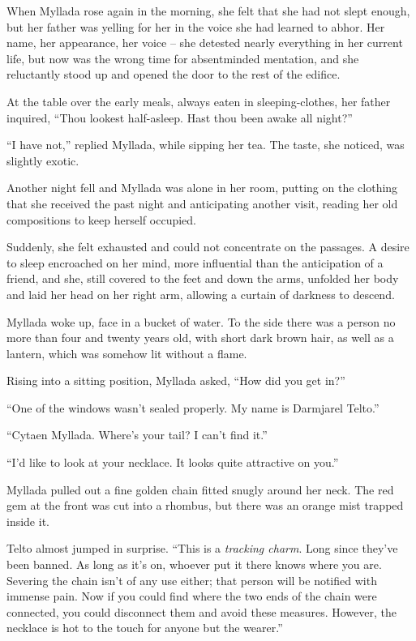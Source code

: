 When Myllada rose again in the morning, she felt that she had not slept enough, but her father was yelling for her in the voice she had learned to abhor. Her name, her appearance, her voice -- she detested nearly everything in her current life, but now was the wrong time for absentminded mentation, and she reluctantly stood up and opened the door to the rest of the edifice.

At the table over the early meals, always eaten in sleeping-clothes, her father inquired, ``Thou lookest half-asleep. Hast thou been awake all night?''

``I have not,'' replied Myllada, while sipping her tea. The taste, she noticed, was slightly exotic.

\centeredstars

Another night fell and Myllada was alone in her room, putting on the clothing that she received the past night and anticipating another visit, reading her old compositions to keep herself occupied.

Suddenly, she felt exhausted and could not concentrate on the passages. A desire to sleep encroached on her mind, more influential than the anticipation of a friend, and she, still covered to the feet and down the arms, unfolded her body and laid her head on her right arm, allowing a curtain of darkness to descend.

\centeredstars

Myllada woke up, face in a bucket of water. To the side there was a person no more than four and twenty years old, with short dark brown hair, as well as a lantern, which was somehow lit without a flame.

Rising into a sitting position, Myllada asked, ``How did you get in?''

``One of the windows wasn't sealed properly. My name is Darmjarel Telto.''

``Cytaen Myllada. Where's your tail? I can't find it.''

``I'd like to look at your necklace. It looks quite attractive on you.''

Myllada pulled out a fine golden chain fitted snugly around her neck. The red gem at the front was cut into a rhombus, but there was an orange mist trapped inside it.

Telto almost jumped in surprise. ``This is a \emph{tracking charm}. Long since they've been banned. As long as it's on, whoever put it there knows where you are. Severing the chain isn't of any use either; that person will be notified with immense pain. Now if you could find where the two ends of the chain were connected, you could disconnect them and avoid these measures. However, the necklace is hot to the touch for anyone but the wearer.''

